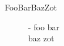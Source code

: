 \documentclass[14pt,handout]{beamer}
\begin{document}
\begin{frame}\frametitle{}
  \begin{description}
  \item[FooBarBazZot] - foo bar \\ baz zot
  \end{description}
\end{frame}
\end{document}
